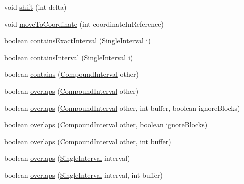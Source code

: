 \begin{DoxyCompactItemize}
\item 
void \hyperlink{classumms_1_1core_1_1annotation_1_1_compound_interval_af2ab21545b4361433fd942b851d74993}{shift} (int delta)
\item 
void \hyperlink{classumms_1_1core_1_1annotation_1_1_compound_interval_acd2a18ea0afd561b2d15974f7e5821ae}{move\+To\+Coordinate} (int coordinate\+In\+Reference)
\item 
boolean \hyperlink{classumms_1_1core_1_1annotation_1_1_compound_interval_ae5614a7f4a1a316d34000d64aa5c9ce1}{contains\+Exact\+Interval} (\hyperlink{classumms_1_1core_1_1annotation_1_1_single_interval}{Single\+Interval} i)
\item 
boolean \hyperlink{classumms_1_1core_1_1annotation_1_1_compound_interval_a488f2416729954c1bda70925354f1f38}{contains\+Interval} (\hyperlink{classumms_1_1core_1_1annotation_1_1_single_interval}{Single\+Interval} i)
\item 
boolean \hyperlink{classumms_1_1core_1_1annotation_1_1_compound_interval_a3bf8c87e093e0b792f7f26b535070e48}{contains} (\hyperlink{classumms_1_1core_1_1annotation_1_1_compound_interval}{Compound\+Interval} other)
\item 
boolean \hyperlink{classumms_1_1core_1_1annotation_1_1_compound_interval_a791c0da68d3127731c9b922f38e3751c}{overlaps} (\hyperlink{classumms_1_1core_1_1annotation_1_1_compound_interval}{Compound\+Interval} other)
\item 
boolean \hyperlink{classumms_1_1core_1_1annotation_1_1_compound_interval_a82252fc143476b556b0bf3a192233c8e}{overlaps} (\hyperlink{classumms_1_1core_1_1annotation_1_1_compound_interval}{Compound\+Interval} other, int buffer, boolean ignore\+Blocks)
\item 
boolean \hyperlink{classumms_1_1core_1_1annotation_1_1_compound_interval_a9bac3a307b5000336f70b235526a9da0}{overlaps} (\hyperlink{classumms_1_1core_1_1annotation_1_1_compound_interval}{Compound\+Interval} other, boolean ignore\+Blocks)
\item 
boolean \hyperlink{classumms_1_1core_1_1annotation_1_1_compound_interval_aa21aded61a9d5e8dd205c6744f897dfb}{overlaps} (\hyperlink{classumms_1_1core_1_1annotation_1_1_compound_interval}{Compound\+Interval} other, int buffer)
\item 
boolean \hyperlink{classumms_1_1core_1_1annotation_1_1_compound_interval_aa1111ec6321d6343445ea95584a3a0b8}{overlaps} (\hyperlink{classumms_1_1core_1_1annotation_1_1_single_interval}{Single\+Interval} interval)
\item 
boolean \hyperlink{classumms_1_1core_1_1annotation_1_1_compound_interval_a8260591acc0c9957e0ec7dd5ccea893e}{overlaps} (\hyperlink{classumms_1_1core_1_1annotation_1_1_single_interval}{Single\+Interval} interval, int buffer)

\end{DoxyCompactItemize}
